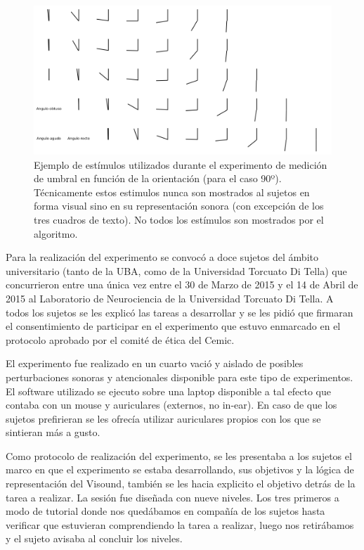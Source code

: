 \documentclass{article}
\begin{document}
    \begin{figure}
        \center
        \includegraphics[width=\textwidth]{Imagenes/ImagenesExp1_2.png}
        \caption{Ejemplo de estímulos utilizados durante el experimento de medición de umbral en función de la orientación (para el caso 90º). Técnicamente estos estimulos nunca son mostrados al sujetos en forma visual sino en su representación sonora (con excepción de los tres cuadros de texto). No todos los estímulos son mostrados por el algoritmo.}
        \label{fig:ImagenesExp1}
    \end{figure}  
    
    Para la realización del experimento se convocó a doce sujetos del ámbito universitario (tanto de la UBA, como de la Universidad Torcuato Di Tella) que concurrieron entre una única vez entre el 30 de Marzo de 2015 y el 14 de Abril de 2015 al Laboratorio de Neurociencia de la Universidad Torcuato Di Tella. A todos los sujetos se les explicó las tareas a desarrollar y se les pidió que firmaran el consentimiento de participar en el experimento que estuvo enmarcado en el protocolo aprobado por el comité de ética del Cemic. 
    
    El experimento fue realizado en un cuarto vació y aislado de posibles perturbaciones sonoras y atencionales disponible para este tipo de experimentos. El software utilizado se ejecuto sobre una laptop disponible a tal efecto que contaba con un mouse y auriculares (externos, no in-ear). En caso de que los sujetos prefirieran se les ofrecía utilizar auriculares propios con los que se sintieran más a gusto.
    
    Como protocolo de realización del experimento, se les presentaba a los sujetos el marco en que el experimento se estaba desarrollando, sus objetivos y la lógica de representación del Visound, también se les hacia explicito el objetivo detrás de la tarea a realizar. La sesión fue diseñada con nueve niveles. Los tres primeros a modo de tutorial donde nos quedábamos en compañía de los sujetos hasta verificar que estuvieran comprendiendo la tarea a realizar, luego nos retirábamos y el sujeto avisaba al concluir los niveles. 
    
\end{document}
